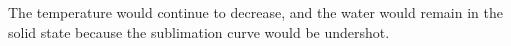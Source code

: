The temperature would continue to decrease, and the water would remain in the solid state because the sublimation curve would be undershot.